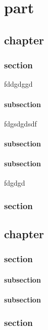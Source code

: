 \documentclass[a4paper]{book}
\begin{document}
\part{part}

\chapter{chapter}


\section{section}

fddgdggd

\subsection{subsection}
fdgsdgdsdf

\subsection{subsection}

\newpage

\subsection{subsection}

fdgdgd

\section{section}

\chapter{chapter}

\section{section}

\subsection{subsection}
\subsection{subsection}

\section{section}
\end{document}
